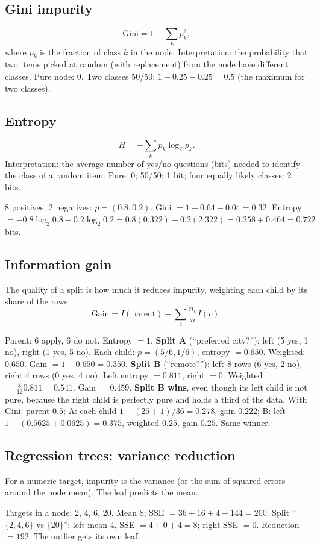 \subsection{Gini impurity}
\[ \text{Gini} = 1 - \sum_k p_k^2, \]
where $p_k$ is the fraction of class $k$ in the node. Interpretation: the probability that two items picked at random
(with replacement) from the node have different classes. Pure node: 0. Two classes 50/50: $1 - 0.25 - 0.25 = 0.5$
(the maximum for two classes).

\subsection{Entropy}
\[ H = -\sum_k p_k\log_2 p_k. \]
Interpretation: the average number of yes/no questions (bits) needed to identify the class of a random item. Pure: 0;
50/50: 1 bit; four equally likely classes: 2 bits.

\begin{example}
8 positives, 2 negatives: $p = (0.8, 0.2)$.
Gini $= 1 - 0.64 - 0.04 = 0.32$. Entropy $= -0.8\log_2 0.8 - 0.2\log_2 0.2 = 0.8(0.322) + 0.2(2.322) = 0.258 + 0.464 = 0.722$ bits.
\end{example}

\subsection{Information gain}
The quality of a split is how much it reduces impurity, weighting each child by its share of the rows:
\[ \text{Gain} = I(\text{parent}) - \sum_{c}\frac{n_c}{n}I(c). \]

\begin{example}
Parent: 6 apply, 6 do not. Entropy $=1$.
\textbf{Split A} (``preferred city?''): left (5 yes, 1 no), right (1 yes, 5 no). Each child: $p = (5/6, 1/6)$, entropy
$= 0.650$. Weighted: $0.650$. Gain $= 1 - 0.650 = 0.350$.
\textbf{Split B} (``remote?''): left 8 rows (6 yes, 2 no), right 4 rows (0 yes, 4 no). Left entropy $= 0.811$, right $= 0$.
Weighted $= \frac{8}{12}0.811 = 0.541$. Gain $= 0.459$. \textbf{Split B wins}, even though its left child is not pure, because
the right child is perfectly pure and holds a third of the data.
With Gini: parent $0.5$; A: each child $1 - (25+1)/36 = 0.278$, gain $0.222$; B: left $1 - (0.5625 + 0.0625) = 0.375$,
weighted $0.25$, gain $0.25$. Same winner.
\end{example}

\subsection{Regression trees: variance reduction}
For a numeric target, impurity is the variance (or the sum of squared errors around the node mean). The leaf predicts the
mean.
\begin{example}
Targets in a node: 2, 4, 6, 20. Mean 8; SSE $= 36 + 16 + 4 + 144 = 200$. Split ``$\{2,4,6\}$ vs $\{20\}$'': left mean 4, SSE $=
4 + 0 + 4 = 8$; right SSE $= 0$. Reduction $= 192$. The outlier gets its own leaf.
\end{example}

